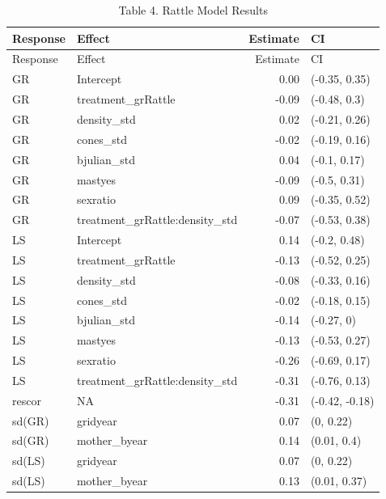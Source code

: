 \documentclass[
]{article}
\begin{document}
\begin{longtable}[]{@{}llrl@{}}
\caption{Table 4. Rattle Model Results}\tabularnewline
\toprule\noalign{}
Response & Effect & Estimate & CI \\
\midrule\noalign{}
\endfirsthead
\toprule\noalign{}
Response & Effect & Estimate & CI \\
\midrule\noalign{}
\endhead
\bottomrule\noalign{}
\endlastfoot
GR & Intercept & 0.00 & (-0.35, 0.35) \\
GR & treatment\_grRattle & -0.09 & (-0.48, 0.3) \\
GR & density\_std & 0.02 & (-0.21, 0.26) \\
GR & cones\_std & -0.02 & (-0.19, 0.16) \\
GR & bjulian\_std & 0.04 & (-0.1, 0.17) \\
GR & mastyes & -0.09 & (-0.5, 0.31) \\
GR & sexratio & 0.09 & (-0.35, 0.52) \\
GR & treatment\_grRattle:density\_std & -0.07 & (-0.53, 0.38) \\
LS & Intercept & 0.14 & (-0.2, 0.48) \\
LS & treatment\_grRattle & -0.13 & (-0.52, 0.25) \\
LS & density\_std & -0.08 & (-0.33, 0.16) \\
LS & cones\_std & -0.02 & (-0.18, 0.15) \\
LS & bjulian\_std & -0.14 & (-0.27, 0) \\
LS & mastyes & -0.13 & (-0.53, 0.27) \\
LS & sexratio & -0.26 & (-0.69, 0.17) \\
LS & treatment\_grRattle:density\_std & -0.31 & (-0.76, 0.13) \\
rescor & NA & -0.31 & (-0.42, -0.18) \\
sd(GR) & gridyear & 0.07 & (0, 0.22) \\
sd(GR) & mother\_byear & 0.14 & (0.01, 0.4) \\
sd(LS) & gridyear & 0.07 & (0, 0.22) \\
sd(LS) & mother\_byear & 0.13 & (0.01, 0.37) \\
\end{longtable}
\end{document}
